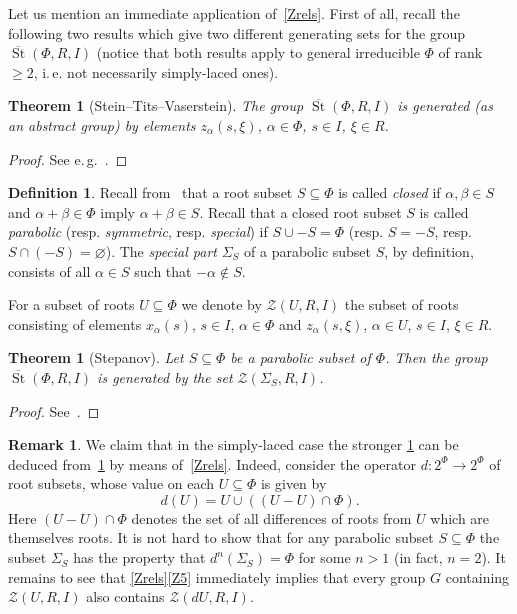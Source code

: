 \documentclass[10pt,a4paper,twoside]{article}
\newtheorem{externaltheorem}[lemma]{Theorem}
\theoremstyle{remark}
\theoremstyle{definition}
\numberwithin{lemma}{section}
\numberwithin{prop}{section}
\numberwithin{corollary}{section}
\numberwithin{externaltheorem}{section}
\newtheorem{df}[lemma]{Definition} \Crefname{df}{Definition}{Definitions}
\newtheorem{rem}[lemma]{Remark}
\DeclareMathOperator{\St}{St}
\numberwithin{equation}{section}
\begin{document}
Let us mention an immediate application of~\cref{Zrels}.
First of all, recall the following two results which give two different generating sets for the group $\overline{\St}(\Phi, R, I)$ (notice that both results apply to general irreducible $\Phi$ of rank $\geq 2$, i.\,e. not necessarily simply-laced ones).
\begin{externaltheorem}[Stein--Tits--Vaserstein] \label{thm:Tits} The group $\overline{\St}(\Phi, R, I)$ is generated (as an abstract group) by elements $z_\alpha(s, \xi)$, $\alpha \in \Phi$, $s \in I$, $\xi \in R$. \end{externaltheorem} \begin{proof} See e.\,g.~\cite[Theorem 2]{Va86}. \end{proof}

\begin{df} \label{df:root-subsets}
Recall from~\cite[Ch.~VI, \S~1.7]{Bou81} that a root subset $S \subseteq \Phi$ is called {\it closed} if $\alpha, \beta \in S$ and $\alpha+\beta\in \Phi$ imply $\alpha + \beta \in S$. 
Recall that a closed root subset $S$ is called {\it parabolic} (resp. {\it symmetric}, resp. {\it special}) if $S \cup -S = \Phi$ (resp. $S = -S$, resp. $S \cap (-S) = \varnothing$).
The {\it special part} $\Sigma_S$ of a parabolic subset $S$, by definition, consists of all $\alpha \in S$ such that $-\alpha \not\in S$.
\end{df}

For a subset of roots $U \subseteq \Phi$ we denote by $\mathcal{Z}(U, R, I)$ the subset of roots consisting of elements $x_\alpha(s)$, $s \in I$, $\alpha \in \Phi$ and $z_\alpha(s, \xi)$, $\alpha \in U$, $s\in I$, $\xi \in R$.
\begin{externaltheorem}[Stepanov] \label{thm:Stepanov} 
Let $S \subseteq \Phi$ be a parabolic subset of $\Phi$. Then the group $\overline{\St}(\Phi, R, I)$ is generated by the set $\mathcal{Z}(\Sigma_S, R, I)$.
 \end{externaltheorem} \begin{proof} See~\cite[Lemma~4]{S15}. \end{proof}

\begin{rem} We claim that in the simply-laced case the stronger \cref{thm:Stepanov} can be deduced from~\cref{thm:Tits} by means of~\cref{Zrels}. Indeed, consider the operator $d \colon 2^\Phi \to 2^\Phi$ of root subsets, whose value on each $U \subseteq \Phi$ is given by \[d(U) = U \cup \left((U - U)\cap \Phi\right).\]
Here $(U-U) \cap \Phi$ denotes the set of all differences of roots from $U$ which are themselves roots. It is not hard to show that for any parabolic subset $S \subseteq \Phi$ the subset $\Sigma_S$ has the property that $d^n(\Sigma_S) = \Phi$ for some $n>1$ (in fact, $n=2$). It remains to see that \cref{Zrels}\ref{Z5} immediately implies that every group $G$ containing $\mathcal{Z}(U, R, I)$ also contains $\mathcal{Z}(dU, R, I)$. \end{rem}
\end{document}
